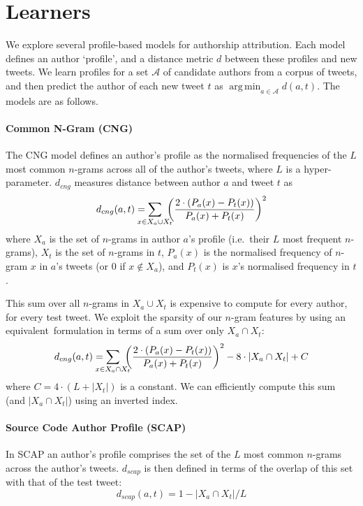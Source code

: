 \documentclass[twocolumn,10pt]{article}
\DeclareMathOperator*{\argmin}{arg\,min}
\begin{document}
\section{Learners}

We explore several profile-based models for authorship attribution.
Each model defines an author  `profile', and a distance metric $d$
between these profiles and new tweets.
We learn profiles for a set $\mathcal{A}$ of candidate authors from
a corpus of tweets, and then predict the author of each new tweet
$t$ as $\argmin_{a \in \mathcal{A}} d(a, t)$.
The models are as follows.

\paragraph{Common N-Gram (CNG)}
\label{par:cng}
The CNG model\supercite{kevselj2003n} defines an author's profile
as the normalised frequencies of the $L$ most common $n$-grams
across all of the author's tweets, where $L$ is a hyper-parameter.
$d_{cng}$ measures distance between author $a$ and tweet $t$ as
$$
d_{cng}(a, t) =
    \smashoperator{\sum_{x \in X_a \cup X_t}}\ 
        {\left ( \frac{2 \cdot (P_a(x) - P_t(x))}{P_a(x) + P_t(x)} \right )}^2
$$
where
$X_a$ is the set of $n$-grams in author $a$'s profile
(i.e.~their $L$ most frequent $n$-grams),
$X_t$ is the set of $n$-grams in $t$,
$P_a(x)$ is the normalised frequency of $n$-gram $x$ in $a$'s
tweets (or 0 if $x \notin X_a$),
and
$P_t(x)$ is $x$'s normalised frequency in $t$.

This sum over all $n$-grams in $X_a \cup X_t$ is expensive
to compute for every author, for every test tweet.
We exploit the sparsity of our $n$-gram features by using
an equivalent\footnotemark~formulation in terms of a sum over
only $X_a \cap X_t$:
$$
d_{cng} (a, t) =
    \smashoperator{\sum_{x \in X_a \cap X_t}}\ 
        {\left ( \frac{2 \cdot (P_a(x) - P_t(x))}{P_a(x) + P_t(x)} \right )}^2
        - 8 \cdot |X_a \cap X_t| + C
$$
where $C=4 \cdot (L + |X_t|)$ is a constant.
We can efficiently compute this sum (and $|X_a \cap X_t|$)
using an inverted index.

\paragraph{Source Code Author Profile (SCAP)} In SCAP\supercite{frantzeskou2006effective}
an author's profile comprises the set of the $L$ most common
$n$-grams across the author's tweets. $d_{scap}$ is then defined in
terms of the overlap of this set with that of the test tweet:
$$
d_{scap}(a, t) = 1 - |X_a \cap X_t| / L
$$
\end{document}
